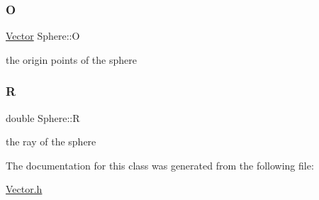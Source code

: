 \subsubsection{\texorpdfstring{O}{O}}
{\footnotesize\ttfamily \hyperlink{classVector}{Vector} Sphere\+::O}

the origin points of the sphere \mbox{\label{classSphere_ae63beb5380ccbbb9ba820c54d03d02ef}} 
\subsubsection{\texorpdfstring{R}{R}}
{\footnotesize\ttfamily double Sphere\+::R}

the ray of the sphere 

The documentation for this class was generated from the following file\+:\begin{DoxyCompactItemize}
\item 
\hyperlink{Vector_8h}{Vector.\+h}\end{DoxyCompactItemize}

